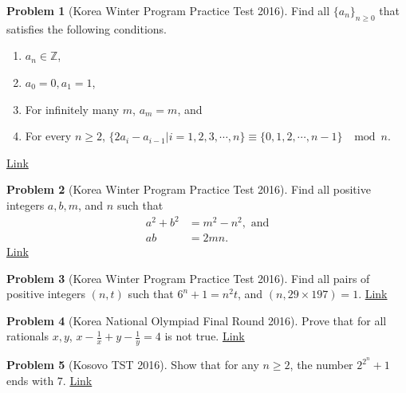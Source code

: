 \documentclass[]{article}
\theoremstyle{definition}
\newtheorem{problem}{Problem}
\begin{document}
\begin{problem}[Korea Winter Program Practice Test 2016]
	Find all $\{a_n\}_{n\ge 0}$ that satisfies the following conditions.
		\begin{enumerate}
			\item $a_n\in \mathbb{Z}$,
			\item $a_0=0, a_1=1$,
			\item For infinitely many $m$, $a_m=m$, and
			\item For every $n\ge2$, $\{2a_i-a_{i-1} | i=1, 2, 3, \cdots , n\}\equiv \{0, 1, 2, \cdots , n-1\}$ $\mod n$.
		\end{enumerate}
	\hfill \href{http://artofproblemsolving.com/community/c6h1189496p5795891}{Link}
\end{problem}




\begin{problem}[Korea Winter Program Practice Test 2016]
	Find all positive integers $a, b, m$, and $n$ such that
		\begin{align*}
			a^2+b^2 &=m^2-n^2, \text{ and}\\
			ab &=2mn.
		\end{align*}
	\hfill \href{http://artofproblemsolving.com/community/c6h1189489p5795855}{Link}
\end{problem}



\begin{problem}[Korea Winter Program Practice Test 2016]
	Find all pairs of positive integers $(n,t)$ such that $6^n+1=n^2t$, and $(n,29 \times 197)=1$. \hfill \href{http://artofproblemsolving.com/community/c6h1189502p5795910}{Link}
\end{problem}




\begin{problem}[Korea National Olympiad Final Round 2016]
	Prove that for all rationals $x,y$, $x-\frac{1}{x}+y-\frac{1}{y}=4$ is not true. \hfill \href{http://artofproblemsolving.com/community/c6h1214200p6032947}{Link}
\end{problem}



\begin{problem}[Kosovo TST 2016]
	Show that for any $n\geq 2$, the number $2^{2^n}+1$ ends with $7$. \hfill \href{http://artofproblemsolving.com/community/c6h1222334p6119900}{Link}
\end{problem}
\end{document}
